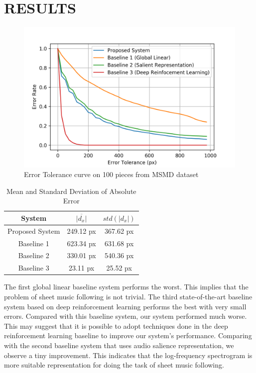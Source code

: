 \documentclass[letterpaper, 10pt, conference]{ieeeconf}  %
\begin{document}
\section{RESULTS}

\begin{figure}
    \centering
    \includegraphics[scale=0.61]{images/final_result.png}
    \caption{Error Tolerance curve on 100 pieces from MSMD dataset}
    \label{fig:result}
\end{figure}
\begin{table}[]
    \centering
    \begin{tabular}{c|c|c}
        \textbf{System} & $\overline{|d_x|}$ & $std(|d_x|)$ \\\hline\hline
        Proposed System & 249.12 px & 367.62 px\\
        Baseline 1 & 623.34 px & 631.68 px\\
        Baseline 2 & 330.01 px & 540.36 px\\
        Baseline 3 \cite{dorfer} & 23.11 px & 25.52 px 
    \end{tabular}
    \caption{Mean and Standard Deviation of Absolute Error}
    \label{tab:result}
\end{table}

The first global linear baseline system performs the worst. This implies that the problem of sheet music following is not trivial. The third state-of-the-art baseline system based on deep reinforcement learning performs the best with very small errors. Compared with this baseline system, our system performed much worse. This may suggest that it is possible to adopt techniques done in the deep reinforcement learning baseline \cite{dorfer} to improve our system’s performance. Comparing with the second baseline system that uses audio salience representation, we observe a tiny improvement. This indicates that the log-frequency spectrogram is more suitable representation for doing the task of sheet music following.
\end{document}
